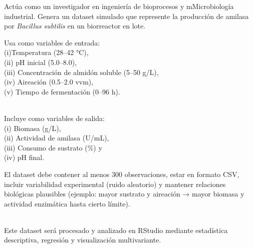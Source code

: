 \documentclass[
  spanish,
  letterpaper,
  DIV=11,
  numbers=noendperiod]{scrreprt}
\begin{document}
\begin{tcolorbox}[enhanced jigsaw, colback=white, breakable, toptitle=1mm, toprule=.15mm, colbacktitle=quarto-callout-tip-color!10!white, bottomrule=.15mm, coltitle=black, titlerule=0mm, opacityback=0, leftrule=.75mm, bottomtitle=1mm, colframe=quarto-callout-tip-color-frame, left=2mm, title=\textcolor{quarto-callout-tip-color}{\faLightbulb}\hspace{0.5em}{Segundo modelo de Prompt}, rightrule=.15mm, opacitybacktitle=0.6, arc=.35mm]

Actúa como un investigador en ingeniería de bioprocesos y mMicrobiología
industrial. Genera un dataset simulado que represente la producción de
amilasa por \emph{Bacillus subtilis} en un biorreactor en lote.

Usa como variables de entrada:\\
(i)Temperatura (28--42 °C),\\
(ii) pH inicial (5.0--8.0),\\
(iii) Concentración de almidón soluble (5--50 g/L),\\
(iv) Aireación (0.5--2.0 vvm),\\
(v) Tiempo de fermentación (0--96 h).\\
\strut \\
Incluye como variables de salida:\\
(i) Biomasa (g/L),\\
(ii) Actividad de amilasa (U/mL),\\
(iii) Consumo de sustrato (\%) y\\
(iv) pH final.

El dataset debe contener al menos 300 observaciones, estar en formato
CSV, incluir variabilidad experimental (ruido aleatorio) y mantener
relaciones biológicas plausibles (ejemplo: mayor sustrato y aireación →
mayor biomasa y actividad enzimática hasta cierto límite).\\
\strut \\
Este dataset será procesado y analizado en RStudio mediante estadística
descriptiva, regresión y visualización multivariante.

\end{tcolorbox}
\end{document}

